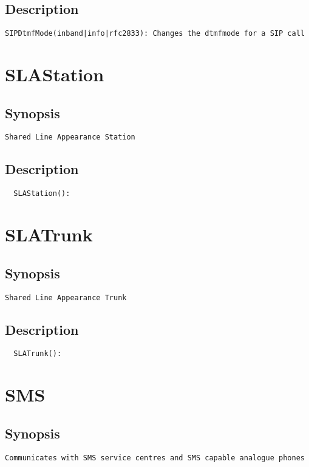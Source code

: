 \subsection{Description}
\begin{verbatim}
SIPDtmfMode(inband|info|rfc2833): Changes the dtmfmode for a SIP call

\end{verbatim}


\section{SLAStation}
\subsection{Synopsis}
\begin{verbatim}
Shared Line Appearance Station
\end{verbatim}
\subsection{Description}
\begin{verbatim}
  SLAStation():

\end{verbatim}


\section{SLATrunk}
\subsection{Synopsis}
\begin{verbatim}
Shared Line Appearance Trunk
\end{verbatim}
\subsection{Description}
\begin{verbatim}
  SLATrunk():

\end{verbatim}


\section{SMS}
\subsection{Synopsis}
\begin{verbatim}
Communicates with SMS service centres and SMS capable analogue phones
\end{verbatim}
